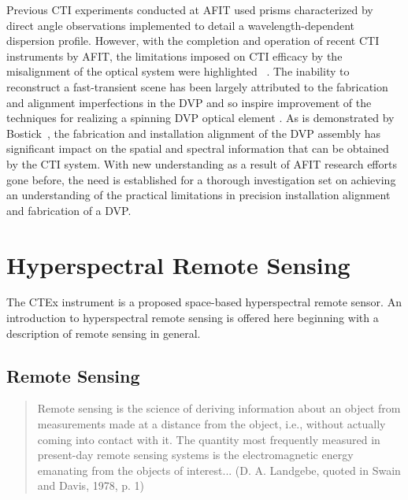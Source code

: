 Previous \ac{CTI} experiments conducted at \ac{AFIT} used prisms characterized by direct angle observations implemented to detail a wavelength-dependent dispersion profile. However, with the completion and operation of recent \ac{CTI} instruments by \ac{AFIT}, the limitations imposed on \ac{CTI} efficacy by the misalignment of the optical system were highlighted~\cite{Sue} \cite{Bostick}. The inability to reconstruct a fast-transient scene has been largely attributed to the fabrication and alignment imperfections in the \ac{DVP} and so inspire improvement of the techniques for realizing a spinning \ac{DVP} optical element \cite{HawksATF}. As is demonstrated by Bostick~\cite{Bostick}, the fabrication and installation alignment of the \ac{DVP} assembly has significant impact on the spatial and spectral information that can be obtained by the \ac{CTI} system. With new understanding as a result of \ac{AFIT} research efforts gone before, the need is established for a thorough investigation set on achieving an understanding of the practical limitations in precision installation alignment and fabrication of a \ac{DVP}.

\section{Hyperspectral Remote Sensing}
\label{sec:hyperspectralRemoteSensing}

The \ac{CTEx} instrument is a proposed space-based hyperspectral remote sensor. An introduction to hyperspectral remote sensing is offered here beginning with a description of remote sensing in general.

\subsection{Remote Sensing}
\begin{quote}
Remote sensing is the science of deriving information about an object from measurements made at a distance from the object, i.e., without actually coming into contact with it. The quantity most frequently measured in present-day remote sensing systems is the electromagnetic energy emanating from the objects of interest... (D. A. Landgebe, quoted in Swain and Davis, 1978, p. 1) \cite{Campbell}
\end{quote}

